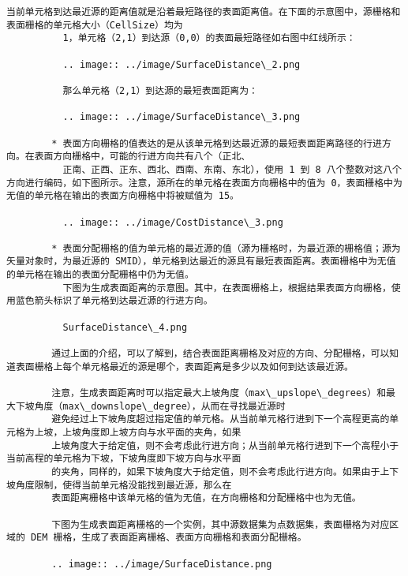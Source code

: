 \documentclass[11pt]{article}
\begin{document}
\begin{Verbatim}[commandchars=\\\{\}]
          当前单元格到达最近源的距离值就是沿着最短路径的表面距离值。在下面的示意图中，源栅格和表面栅格的单元格大小（CellSize）均为
          1，单元格（2,1）到达源（0,0）的表面最短路径如右图中红线所示：
        
          .. image:: ../image/SurfaceDistance\_2.png
        
          那么单元格（2,1）到达源的最短表面距离为：
        
          .. image:: ../image/SurfaceDistance\_3.png
        
        * 表面方向栅格的值表达的是从该单元格到达最近源的最短表面距离路径的行进方向。在表面方向栅格中，可能的行进方向共有八个（正北、
          正南、正西、正东、西北、西南、东南、东北），使用 1 到 8 八个整数对这八个方向进行编码，如下图所示。注意，源所在的单元格在表面方向栅格中的值为 0，表面栅格中为无值的单元格在输出的表面方向栅格中将被赋值为 15。
        
          .. image:: ../image/CostDistance\_3.png
        
        * 表面分配栅格的值为单元格的最近源的值（源为栅格时，为最近源的栅格值；源为矢量对象时，为最近源的 SMID），单元格到达最近的源具有最短表面距离。表面栅格中为无值的单元格在输出的表面分配栅格中仍为无值。
          下图为生成表面距离的示意图。其中，在表面栅格上，根据结果表面方向栅格，使用蓝色箭头标识了单元格到达最近源的行进方向。
        
          SurfaceDistance\_4.png
        
        通过上面的介绍，可以了解到，结合表面距离栅格及对应的方向、分配栅格，可以知道表面栅格上每个单元格最近的源是哪个，表面距离是多少以及如何到达该最近源。
        
        注意，生成表面距离时可以指定最大上坡角度（max\_upslope\_degrees）和最大下坡角度（max\_downslope\_degree），从而在寻找最近源时
        避免经过上下坡角度超过指定值的单元格。从当前单元格行进到下一个高程更高的单元格为上坡，上坡角度即上坡方向与水平面的夹角，如果
        上坡角度大于给定值，则不会考虑此行进方向；从当前单元格行进到下一个高程小于当前高程的单元格为下坡，下坡角度即下坡方向与水平面
        的夹角，同样的，如果下坡角度大于给定值，则不会考虑此行进方向。如果由于上下坡角度限制，使得当前单元格没能找到最近源，那么在
        表面距离栅格中该单元格的值为无值，在方向栅格和分配栅格中也为无值。
        
        下图为生成表面距离栅格的一个实例，其中源数据集为点数据集，表面栅格为对应区域的 DEM 栅格，生成了表面距离栅格、表面方向栅格和表面分配栅格。
        
        .. image:: ../image/SurfaceDistance.png
        

\end{Verbatim}
\end{document}
